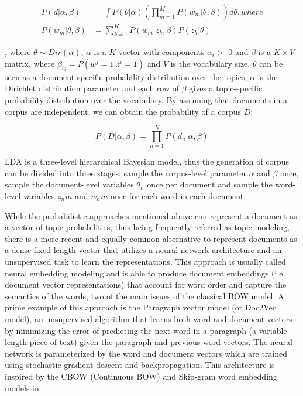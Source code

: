 \documentclass[a4paper]{article}
\begin{document}
\begin{subequations}
	\begin{align}
		P(d|\alpha,\beta) & = \int P(\theta|\alpha)\left(\prod_{m=1}^M P(w_m|\theta,\beta)\right) d\theta, where \\
		P(w_m|\theta,\beta) & = \sum_{k=1}^K P(w_m|z_k,\beta)P(z_k|\theta)
	\end{align}
\end{subequations}

, where $\theta \sim Dir(\alpha)$, $\alpha$ is a $K$-vector with components $\alpha_i >$ 0 and $\beta$ is a $K\times V$ matrix, where $\beta_{ij}=P(w^j=1|z^i=1)$ and $V$ is the vocabulary size. $\theta$ can be seen as a document-specific probability distribution over the topics, $\alpha$ is the Dirichlet distribution parameter and each row of $\beta$ gives a topic-specific probability distribution over the vocabulary. By assuming that documents in a corpus are independent, we can obtain the probability of a corpus $D$:

\begin{equation}
	P(D|\alpha,\beta) = \prod_{n=1}^N P(d_n|\alpha, \beta)
\end{equation}

LDA is a three-level hierarchical Bayesian model, thus the generation of corpus can be divided into three stages: sample the corpus-level parameter $\alpha$ and $\beta$ once, sample the document-level variables $\theta_n$ once per document and sample the word-level variables $z_nm$ and $w_nm$ once for each word in each document.

While the probabilistic approaches mentioned above can represent a document as a vector of topic probabilities, thus being frequently referred as topic modeling, there is a more recent and equally common alternative to represent documents as a dense fixed-length vector that utilizes a neural network architecture and an unsupervised task to learn the representations. This approach is usually called neural embedding modeling and is able to produce document embeddings (i.e. document vector representations) that account for word order and capture the semantics of the words, two of the main issues of the classical BOW model. A prime example of this approach is the Paragraph vector model \citep{le2014} (or Doc2Vec model), an unsupervised algorithm that learns both word and document vectors by minimizing the error of predicting the next word in a paragraph (a variable-length piece of text) given the paragraph and previous word vectors. The neural network is parameterized by the word and document vectors which are trained using stochastic gradient descent and backpropagation. This architecture is inspired by the CBOW (Continuous BOW) and Skip-gram word embedding models in \citet{mikolov2013}.
\end{document}
